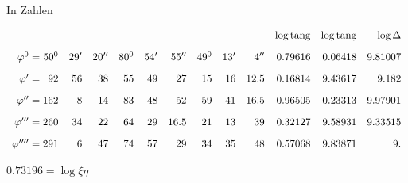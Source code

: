In Zahlen
\par\nopagebreak%
\begingroup\small\relax\setlength{\arraycolsep}{2pt}\[
\begin{array}{r@{\;}c@{\;}rrr@{\quad}rrr@{\quad}rrr@{\quad}rrr} &&&&&&&&&&&\log\operatorname{tang}&\log\operatorname{tang}&\log\Delta\\[9pt] \varphi^0&=&50^0&29'&20''&80^0&54'&55''&49^0&13'&4''&0.79616&0.06418&9.81007\\[9pt] \varphi'&=&92&56&38&55&49&27&15&16&12.5&0.16814&9.43617&9.182\\[9pt] \varphi''&=&162&8&14&83&48&52&59&41&16.5&0.96505&0.23313&9.97901\\[9pt] \varphi'''&=&260&34&22&64&29&16.5&21&13&39&0.32127&9.58931&9.33515\\[9pt] \varphi''''&=&291&6&47&74&57&29&34&35&48&0.57068&9.83871&9. \end{array}
\]\endgroup\par%

\hfill $0.73196=\log\xi\eta$\hspace*{.12\textwidth}\par

